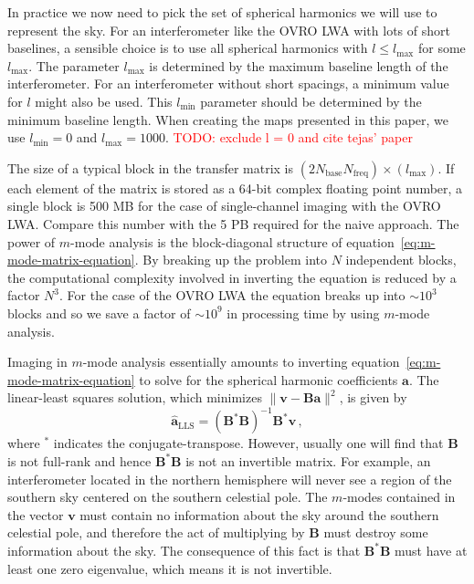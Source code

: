 \documentclass[twocolumn]{aastex6}
\renewcommand{\b}{\pmb}
\newcommand{\todo}[1]{\textcolor{red}{TODO: #1}\PackageWarning{TODO:}{#1!}}
\begin{document}
In practice we now need to pick the set of spherical harmonics we will use to represent the sky. For
an interferometer like the OVRO LWA with lots of short baselines, a sensible choice is to use all
spherical harmonics with $l\le l_\text{max}$ for some $l_\text{max}$. The parameter $l_\text{max}$
is determined by the maximum baseline length of the interferometer.  For an interferometer without
short spacings, a minimum value for $l$ might also be used. This $l_\text{min}$ parameter should be
determined by the minimum baseline length.  When creating the maps presented in this paper, we use
$l_\text{min} = 0$ and $l_\text{max} = 1000$.
\todo{exclude l = 0 and cite tejas' paper}

The size of a typical block in the transfer matrix is
$(2N_\text{base}N_\text{freq})\times(l_\text{max})$. If each element of the matrix is stored as a
64-bit complex floating point number, a single block is 500 MB for the case of single-channel
imaging with the OVRO LWA. Compare this number with the 5 PB required for the naive approach.  The
power of $m$-mode analysis is the block-diagonal structure of
equation~\ref{eq:m-mode-matrix-equation}.  By breaking up the problem into $N$ independent blocks,
the computational complexity involved in inverting the equation is reduced by a factor $N^3$. For
the case of the OVRO LWA the equation breaks up into $\sim10^3$ blocks and so we save a factor of
$\sim10^9$ in processing time by using $m$-mode analysis.

Imaging in $m$-mode analysis essentially amounts to inverting
equation~\ref{eq:m-mode-matrix-equation} to solve for the spherical harmonic coefficients $\b a$.
The linear-least squares solution, which minimizes $\|\b v - \b B\b a\|^2$, is given by
\begin{equation}
    \b{\hat a}_\text{LLS} = (\b B^*\b B)^{-1}\b B^*\b v\,,
\end{equation}
where $^*$ indicates the conjugate-transpose. However, usually one will find that $\b B$ is not
full-rank and hence $\b B^*\b B$ is not an invertible matrix. For example, an interferometer located
in the northern hemisphere will never see a region of the southern sky centered on the southern
celestial pole. The $m$-modes contained in the vector $\b v$ must contain no information
about the sky around the southern celestial pole, and therefore the act of multiplying by $\b B$
must destroy some information about the sky. The consequence of this fact is that $\b B^*\b B$ must
have at least one zero eigenvalue, which means it is not invertible.
\end{document}
